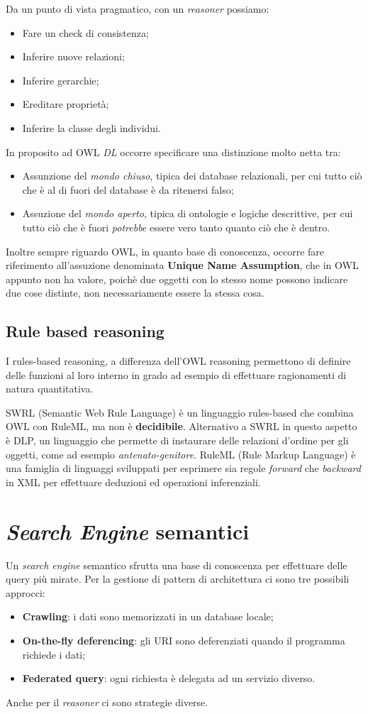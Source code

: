 \documentclass[11pt]{article}
\begin{document}
Da un punto di vista pragmatico, con un \textit{reasoner} possiamo:
\begin{itemize}
\item Fare un check di consistenza;
\item Inferire nuove relazioni;
\item Inferire gerarchie;
\item Ereditare proprietà;
\item Inferire la classe degli individui.
\end{itemize}
In proposito ad OWL \textit{DL} occorre specificare una distinzione molto netta tra:
\begin{itemize}
\item Assunzione del \textit{mondo chiuso}, tipica dei database relazionali, per cui tutto ciò che è al di fuori del database è da ritenersi falso;
\item Assuzione del \textit{mondo aperto}, tipica di ontologie e logiche descrittive, per cui tutto ciò che è fuori \textit{potrebbe} essere vero tanto quanto ciò che è dentro.
\end{itemize}
Inoltre sempre riguardo OWL, in quanto base di conoscenza, occorre fare riferimento all'assuzione denominata \textbf{Unique Name Assumption}, che in OWL appunto non ha valore, poichè due oggetti con lo stesso nome possono indicare due cose distinte, non necessariamente essere la stessa cosa.

\subsection{Rule based reasoning}
I rules-based reasoning, a differenza dell'OWL reasoning permettono di definire delle funzioni al loro interno in grado ad esempio di effettuare ragionamenti di natura quantitativa. 

SWRL (Semantic Web Rule Language) è un linguaggio rules-based che combina OWL con RuleML, ma non è \textbf{decidibile}.
Alternativo a SWRL in questo aspetto è DLP, un linguaggio che permette di instaurare delle relazioni d'ordine per gli oggetti, come ad esempio \textit{antenato-genitore}.
RuleML (Rule Markup Language) è una famiglia di linguaggi sviluppati per esprimere sia regole \textit{forward} che \textit{backward} in XML per effettuare deduzioni ed operazioni inferenziali.


\section{\textit{Search Engine} semantici}
Un \textit{search engine} semantico sfrutta una base di conoscenza per effettuare delle query più mirate.
Per la gestione di pattern di architettura ci sono tre possibili approcci:
\begin{itemize}
\item \textbf{Crawling}: i dati sono memorizzati in un database locale;
\item \textbf{On-the-fly deferencing}: gli URI sono deferenziati quando il programma richiede i dati;
\item \textbf{Federated query}: ogni richiesta è delegata ad un servizio diverso.
\end{itemize}
Anche per il \textit{reasoner} ci sono strategie diverse.
\end{document}
